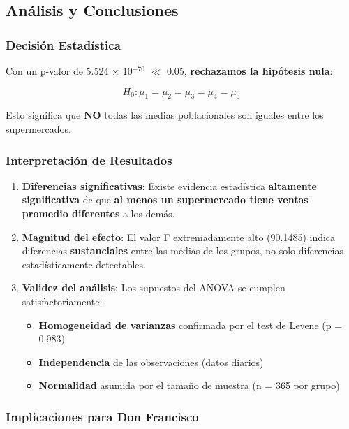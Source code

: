 \documentclass[11pt,a4paper]{article}
\begin{document}
\subsection{Análisis y Conclusiones}

\subsubsection{Decisión Estadística}

Con un p-valor de 5.524 $\times$ 10$^{-70}$ $\ll$ 0.05, \textbf{rechazamos la hipótesis nula}:

$$H_0: \mu_1 = \mu_2 = \mu_3 = \mu_4 = \mu_5$$

Esto significa que \textbf{NO} todas las medias poblacionales son iguales entre los supermercados.

\subsubsection{Interpretación de Resultados}

\begin{enumerate}
    \item \textbf{Diferencias significativas}: Existe evidencia estadística \textbf{altamente significativa} de que \textbf{al menos un supermercado tiene ventas promedio diferentes} a los demás.
    
    \item \textbf{Magnitud del efecto}: El valor F extremadamente alto (90.1485) indica diferencias \textbf{sustanciales} entre las medias de los grupos, no solo diferencias estadísticamente detectables.
    
    \item \textbf{Validez del análisis}: Los supuestos del ANOVA se cumplen satisfactoriamente:
    \begin{itemize}
        \item \textbf{Homogeneidad de varianzas} confirmada por el test de Levene (p = 0.983)
        \item \textbf{Independencia} de las observaciones (datos diarios)
        \item \textbf{Normalidad} asumida por el tamaño de muestra (n = 365 por grupo)
    \end{itemize}
\end{enumerate}

\subsubsection{Implicaciones para Don Francisco}
\end{document}
